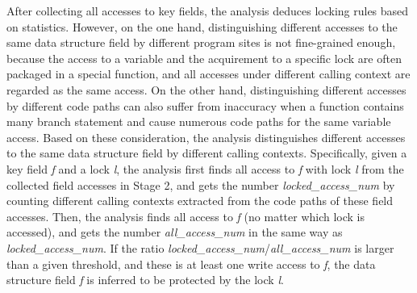  After collecting all accesses to key fields, 
the analysis deduces locking rules based on statistics. However, on the one 
hand, distinguishing different accesses to the same data structure field by 
different program sites is not fine-grained enough, because the access to a 
variable and the acquirement to a specific lock are often packaged in a special 
function, and all accesses under different calling context are regarded as the 
same access. On the other hand, distinguishing different accesses by different 
code paths can also suffer from inaccuracy when a function contains many branch 
statement and cause numerous code paths for the same variable access. Based on 
these consideration, the analysis distinguishes different accesses to the same 
data structure field by different calling contexts. Specifically, given a key 
field {\em f} and a lock {\em l}, the analysis first finds all access to {\em 
f} with lock {\em l} from the collected field accesses in Stage 2, and gets the 
number {\em locked\_access\_num} by counting different calling contexts 
extracted from the code paths of these field accesses. Then, the analysis finds 
all access to {\em f} (no matter which lock is accessed), and gets the number 
{\em all\_access\_num} in the same way as {\em locked\_access\_num}. If the 
ratio {\em locked\_access\_num}/{\em all\_access\_num} is larger than a given 
threshold, and these is at least one write access to {\em f}, the data 
structure field {\em f} is inferred to be protected by the lock {\em l}.
